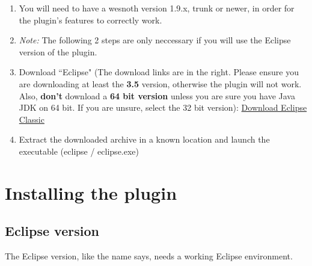 \documentclass[10pt]{article}
\begin{document}
\begin{enumerate}
\item You will need to have a wesnoth version 1.9.x, trunk or newer, in order for the plugin's features to correctly work.

\item \textit{Note:} The following 2 steps are only neccessary if you will use the Eclipse version of the plugin.

\item Download ``Eclipse" (The download links are in the right. Please ensure you are downloading at least the \textbf{3.5} version, otherwise the plugin will not work. Also, \textbf{don't} download a \textbf{64 bit version} unless you are sure you have Java JDK on 64 bit. If you are unsure, select the 32 bit version):   \href{http://www.eclipse.org/downloads/packages/eclipse-classic-37/indigor}{Download Eclipse Classic}

\item Extract the downloaded archive in a known location and launch the executable (eclipse / eclipse.exe)

\end{enumerate}

\section{Installing the plugin}

\subsection{Eclipse version}
The Eclipse version, like the name says, needs a working Eclipse environment.
\end{document}
